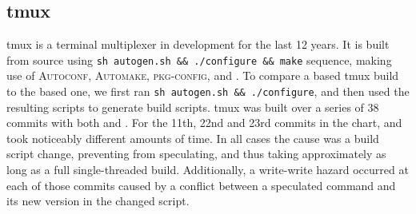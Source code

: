
\subsection{tmux}
\label{sec:eval:tmux}



tmux is a terminal multiplexer in development for the last 12 years.  It is built from source using \verb|sh autogen.sh && ./configure && make| sequence, making use of \textsc{Autoconf}, \textsc{Automake}, \textsc{pkg-config}, and \Make.
To compare a \Rattle based tmux build to the \Make based one, we first ran \texttt{sh autogen.sh \&\& ./configure}, and then used the resulting \Make scripts to generate \Rattle build scripts. tmux was built over a series of 38 commits with both \Make and \Rattle. For the 11th, 22nd and 23rd commits in the chart, \Rattle and \Make took noticeably different amounts of time. In all cases the cause was a build script change, preventing \Rattle from speculating, and thus taking approximately as long as a full single-threaded build. Additionally, a write-write hazard occurred at each of those commits caused by a conflict between a speculated command and its new version in the changed script.



